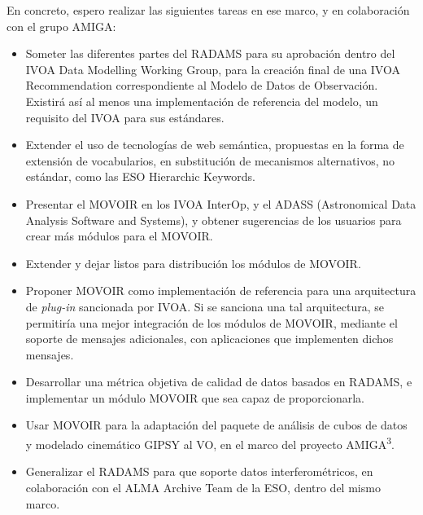 		En concreto, espero realizar las siguientes tareas en ese
		marco, y en colaboración con el grupo AMIGA:
		
		\begin{itemize}
			\item Someter las diferentes partes del RADAMS para su
			aprobación dentro del IVOA Data Modelling Working Group,
			para la creación final de una IVOA Recommendation
			correspondiente al Modelo de Datos de Observación.
			Existirá así al menos una implementación de referencia
			del modelo, un requisito del IVOA para sus estándares.
			
			\item Extender el uso de tecnologías de web semántica,
			propuestas en la forma de extensión de vocabularios,
			en substitución de mecanismos alternativos, no estándar,
			como las ESO Hierarchic Keywords.
			
			\item Presentar el MOVOIR en los IVOA InterOp, y
			el ADASS (Astronomical Data Analysis Software and
			Systems), y obtener sugerencias de los usuarios
			para crear más módulos para el MOVOIR.
			
			\item Extender y dejar listos para distribución
			los módulos de MOVOIR.
			
			\item Proponer MOVOIR como implementación de referencia
			para una arquitectura de \emph{plug-in} sancionada por
			IVOA. Si se sanciona una tal arquitectura, se permitiría
			una mejor integración de los módulos de MOVOIR, mediante
			el soporte de mensajes adicionales, con aplicaciones que
			implementen dichos mensajes.
			
			\item Desarrollar una métrica objetiva de calidad de
			datos basados en RADAMS, e implementar un módulo MOVOIR
			que sea capaz de proporcionarla.
			
			\item Usar MOVOIR para la adaptación del paquete de
			análisis de cubos de datos y modelado cinemático GIPSY
			al VO, en el marco del proyecto
			AMIGA\textsuperscript{3}.
			
			\item Generalizar el RADAMS para que soporte datos
			interferométricos, en colaboración con el ALMA Archive
			Team de la ESO, dentro del mismo marco.
		\end{itemize}
		
	
